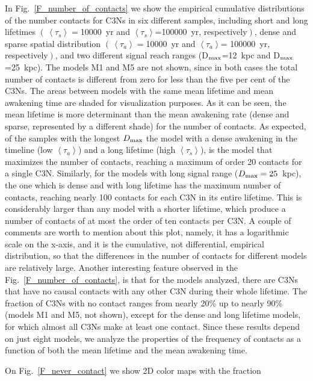 \documentclass[crop]{CSLB}
\newcommand{\ceti}{C3N}
\newcommand{\cetis}{C3Ns}
\newcommand{\ffn}[1]{}
\begin{document}
\ffn{3}
%
In Fig.~\ref{F_number_of_contacts} we show the empirical cumulative
distributions of the number contacts for \cetis{} in six different
samples, including short and long lifetimes
$\left(\,\left<\tau_s\right>=\right.$10000~yr and
$\left<\tau_s\right>$=100000~yr, respectively$\left.\right)$, dense
and sparse spatial distribution
$\left(\,\left<\tau_a\right>=\right.$10000~yr and
$\left<\tau_a\right>$= 100000~yr, respectively$\left.\right)$, and two
different signal reach ranges (D$_{\rm max}$=12~kpc and
D$_{\rm max}$=25~kpc).
%
The models M1 and M5 are not shown, since in both cases the total
number of contacts is different from zero for less than the five per
cent of the \cetis{}.
%
The areas between models with the same mean lifetime and mean
awakening time are shaded for visualization purposes.
%
As it can be seen, the mean lifetime is more
determinant than the mean awakening rate (dense and sparse,
represented by a different shade) for the number of contacts.
%
As expected, of the samples with the longest $D_{\rm max}$ the model with
a dense awakening in the timeline (low $\left<\tau_a\right>$) and a
long lifetime (high $\left<\tau_s\right>$), is the model that
maximizes the number of contacts, reaching a maximum of order 20
contacts for a single \ceti{}.
%
Similarly, for the models with long signal range
($D_{\rm max}=25$~kpc), the one which is dense and with long lifetime
has the maximum number of contacts, reaching nearly 100 contacts for
each \ceti{} in its entire lifetime.
%
This is considerably larger than any model with a shorter lifetime,
which produce a number of contacts of at most the order of ten
contacts per \ceti{}.
%
A couple of comments are worth to mention about this plot, namely, it
has a logarithmic scale on the x-axis, and it is the cumulative, not
differential, empirical distribution, so that the differences in the
number of contacts for different models are relatively large.
%
Another interesting feature observed in the Fig.~\ref{F_number_of_contacts}, is that for the
models analyzed, there are \cetis{} that have no causal contacts with
any other \ceti{} during their whole lifetime.
%
The fraction of \cetis{} with no contact ranges from nearly 20\% up to
nearly 90\% (models M1 and M5, not shown), except for the dense and
long lifetime models, for which almost all \cetis{} make at least one
contact.
%
Since these results depend on just eight models, we analyze the
properties of the frequency of contacts as a function of both the mean
lifetime and the mean awakening time.
%
\ffn{4}
%
On Fig.~\ref{F_never_contact} we show 2D color maps with the fraction
\end{document}
